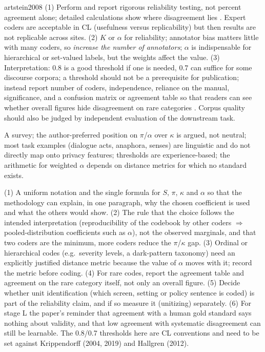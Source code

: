 \begin{papercard}{artstein2008}
 (1) Perform and report rigorous reliability testing, not percent agreement alone; detailed calculations show where disagreement lies . Expert coders are acceptable in CL (usefulness versus replicability) but then results are not replicable across sites. (2) $K$ or $\alpha$ for reliability; annotator bias matters little with many coders, so \emph{increase the number of annotators}; $\alpha$ is indispensable for hierarchical or set-valued labels, but the weights affect the value. (3) Interpretation: 0.8 is a good threshold if one is needed, 0.7 can suffice for some discourse corpora; a threshold should not be a prerequisite for publication; instead report number of coders, independence, reliance on the manual, significance, and a confusion matrix or agreement table so that readers can see whether overall figures hide disagreement on rare categories . Corpus quality should also be judged by independent evaluation of the downstream task.

 A survey; the author-preferred position on $\pi$/$\alpha$ over $\kappa$ is argued, not neutral; most task examples (dialogue acts, anaphora, senses) are linguistic and do not directly map onto privacy features; thresholds are experience-based; the arithmetic for weighted $\alpha$ depends on distance metrics for which no standard exists.

 (1) A uniform notation and the single formula for $S$, $\pi$, $\kappa$ and $\alpha$ so that the methodology can explain, in one paragraph, why the chosen coefficient is used and what the others would show. (2) The rule that the choice follows the intended interpretation (reproducibility of the codebook by other coders $\Rightarrow$ pooled-distribution coefficients such as $\alpha$), not the observed marginals, and that two coders are the minimum, more coders reduce the $\pi$/$\kappa$ gap. (3) Ordinal or hierarchical codes (e.g.\ severity levels, a dark-pattern taxonomy) need an explicitly justified distance metric because the value of $\alpha$ moves with it; record the metric before coding. (4) For rare codes, report the agreement table and agreement on the rare category itself, not only an overall figure. (5) Decide whether unit identification (which screen, setting or policy sentence is coded) is part of the reliability claim, and if so measure it (unitizing) separately. (6) For stage L the paper's reminder that agreement with a human gold standard says nothing about validity, and that low agreement with systematic disagreement can still be learnable. The 0.8/0.7 thresholds here are CL conventions and need to be set against Krippendorff (2004, 2019) and Hallgren (2012).
\end{papercard}
